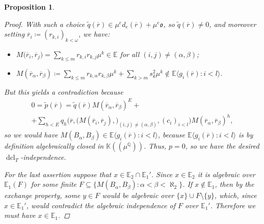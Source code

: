 \documentclass{amsart}
\newtheorem{proposition}[theorem]{Proposition}
\theoremstyle{remark}
\theoremstyle{definition}
\theoremstyle{plain}
\newcommand{\bE}{\mathbb E}
\newcommand{\bK}{\mathbb K}
\newcommand{\bQ}{\mathbb Q}
\newcommand{\co}{\mathfrak o}
\DeclareMathOperator{\dcl}{\mathrm{dcl}}
\newcommand{\Lhp}{(\!(}
\newcommand{\Rhp}{)\!)}
\theoremstyle{plain}
\begin{document}
\begin{proposition}
\begin{proof}
    With such a choice $\tilde{q}(\overline{r})\in \mu^e d_e(\overline{r}) + \mu^{e} \co$, so $\tilde{q}(\overline{r}) \neq 0$, and moreover setting $\overline{r}_{i}\coloneqq (r_{k,i})_{k< \omega}$, we have:
    \begin{itemize}
        \item $M\big(\overline{r}_i, \overline{r}_j) = \sum_{k\le m} r_{k,i}r_{k,j}\mu^k \in \bE$ for all $(i,j) \neq (\alpha, \beta)$;
        \item $M(\overline{r}_{\alpha}, \overline{r}_\beta)\coloneqq \sum_{k\le m} r_{k,\alpha}r_{k,\beta}\mu^k + \sum_{k>m} s_k^2\mu^k \notin \bE \langle g_i(\overline{r}) : i <l\rangle$.
    \end{itemize}
    But this yields a contradiction because
    \[\begin{aligned}
        0=\tilde{p}(\overline{r}) = \tilde{q}(\overline{r})M(\overline{r}_\alpha, \overline{r}_\beta)^E + \\
        + \sum_{h<E} q_h\big(
            \overline{r},
            \big(M(\overline{r}_i, \overline{r}_j), \big)_{(i,j)\neq (\alpha,\beta)},
            (c_i)_{i<l}
        \big) M(\overline{r}_\alpha, \overline{r}_\beta)^h,
    \end{aligned}\]
    so we would have $M(B_\alpha, B_\beta) \in \bE \langle g_{i}(\overline{r}): i<l\rangle$, because $\bE \langle g_{i}(\overline{r}): i<l\rangle$ is by definition algebraically closed in $\bK \Lhp \mu^\bQ\Rhp$. Thus, $p=0$, so we have the desired $\dcl_T$-independence.

    For the last assertion suppose that $x \in \bE_2 \cap \bE_1'$. Since $x \in \bE_2$ it is algebraic over $\bE_1 (F)$ for some finite $F\subseteq \{M(B_\alpha, B_\beta): \alpha<\beta<\aleph_2\}$. If $x \notin \bE_1$, then by the exchange property, some $y \in F$ would be algebraic over $\{x\} \cup F \setminus \{y\}$, which, since $x \in \bE_1'$, would contradict the algebraic independence of $F$ over $\bE_1'$. Therefore we must have $x \in \bE_1$.
    \end{proof}
\end{proposition}
\end{document}
